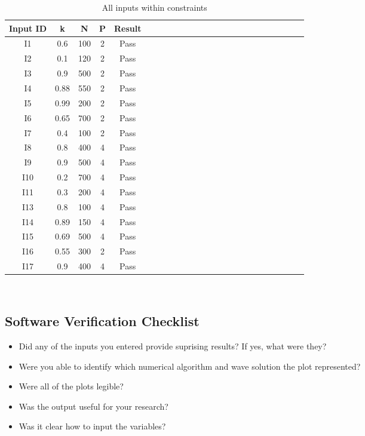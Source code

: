 \documentclass[12pt, titlepage]{article}
\begin{document}
\begin{table}[h!]
	\centering
	\begin{tabular}{|c|c|c|c|c|c|c|c|c|c|c|c|c|c|c|c|c|c|c|c|c|c|c|c|}
		\hline        
		Input ID& k& N & P & Result \\
		\hline
		I1      &0.6 &100 &2 & Pass \\ \hline
		I2     &0.1 &120 &2 & Pass \\ \hline
		I3     &0.9 &500 &2 & Pass\\ \hline 
		I4     &0.88 &550 &2 & Pass \\ \hline 
		I5      &0.99 &200 &2 & Pass \\ \hline
		I6     &0.65 &700 & 2& Pass \\ \hline
		I7    &0.4 &100 & 2& Pass\\ \hline 
		I8     &0.8 &400 &4& Pass \\ \hline
		I9      &0.9 &500 &4 & Pass \\ \hline
		I10     &0.2 &700 &4 & Pass\\ \hline
		I11     &0.3 &200 &4 & Pass \\ \hline 
		I13    &0.8 &100 &4 & Pass  \\ \hline
		I14      &0.89 &150 &4 & Pass \\ \hline
		I15     &0.69 &500 &4 & Pass\\ \hline
		I16     &0.55 &300 &2 & Pass \\ \hline 
		I17    &0.9 &400 &4 & Pass  \\ 
		\hline
	\end{tabular}\\
	\caption{All inputs within constraints}
	\label{Table:D_13}
\end{table} 

\clearpage
\subsection{Software Verification Checklist} 
\label{softwarevercheck}
\begin{itemize}
	\item Did any of the inputs you entered provide suprising results? If yes, 
	what were they?
	\item Were you able to identify which numerical algorithm and wave solution 
	the plot represented? 
	\item Were all of the plots legible? 
	\item Was the output useful for your research? 
	\item Was it clear how to input the variables? 
\end{itemize}  
\end{document}

